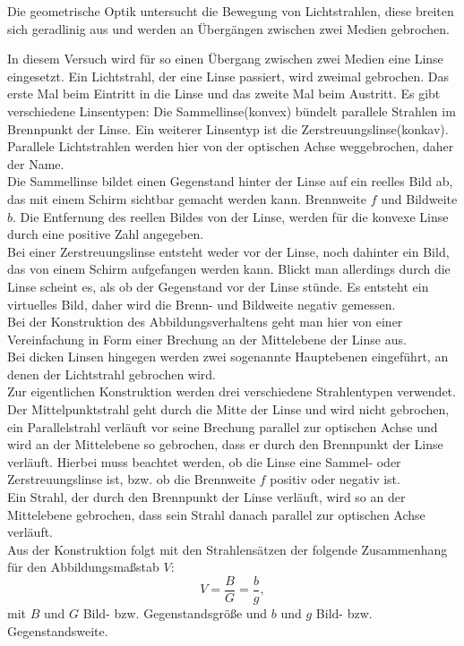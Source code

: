 Die geometrische Optik untersucht die Bewegung von Lichtstrahlen, diese breiten sich geradlinig aus und werden an Übergängen zwischen zwei Medien gebrochen.

In diesem Versuch wird für so einen Übergang zwischen zwei Medien eine Linse eingesetzt. Ein Lichtstrahl, der eine Linse
passiert, wird zweimal gebrochen. Das erste Mal beim Eintritt in
die Linse und das zweite Mal beim Austritt.  Es gibt verschiedene
Linsentypen:  Die Sammellinse(konvex) bündelt parallele Strahlen im Brennpunkt der Linse. Ein weiterer Linsentyp ist die
Zerstreuungslinse(konkav). Parallele Lichtstrahlen werden hier von der optischen Achse weggebrochen, daher der Name.\\

Die Sammellinse bildet einen Gegenstand hinter der Linse auf ein reelles Bild ab, das mit einem Schirm sichtbar gemacht werden kann. Brennweite $f$ und Bildweite $b$. Die Entfernung des reellen Bildes von der Linse, werden für die konvexe Linse durch eine positive Zahl angegeben.\\
Bei einer Zerstreuungslinse entsteht weder vor der Linse, noch dahinter ein
Bild, das von einem Schirm aufgefangen werden kann. Blickt man
allerdings durch die Linse scheint es, als ob der Gegenstand vor der
Linse stünde. Es entsteht ein virtuelles Bild, daher wird die Brenn- und Bildweite negativ gemessen.\\

Bei der Konstruktion des Abbildungsverhaltens geht man hier von einer Vereinfachung in Form einer Brechung an der Mittelebene der Linse aus.\\
Bei dicken Linsen hingegen werden zwei sogenannte
Hauptebenen eingeführt, an denen der Lichtstrahl gebrochen wird.\\
Zur eigentlichen Konstruktion werden drei verschiedene Strahlentypen
verwendet. Der Mittelpunktstrahl geht durch die Mitte der Linse und
wird nicht gebrochen, ein Parallelstrahl verläuft vor seine Brechung
parallel zur optischen Achse und wird an der Mittelebene so gebrochen,
dass er durch den Brennpunkt der Linse verläuft. Hierbei muss beachtet
werden, ob die Linse eine Sammel- oder Zerstreuungslinse ist, bzw. ob
die Brennweite $f$ positiv oder negativ ist.\\
Ein Strahl, der durch den Brennpunkt der Linse verläuft, wird so an der Mittelebene gebrochen, dass sein Strahl danach parallel zur optischen Achse verläuft.\\

Aus der Konstruktion folgt mit den Strahlensätzen der folgende
Zusammenhang für den Abbildungsmaßstab $V$:
%
\begin{equation}
  V = \frac{B}{G} = \frac{b}{g},
  \label{eq:Theorie_Abbildungsgesetz}
\end{equation}
%
mit $B$ und $G$ Bild- bzw. Gegenstandsgröße und $b$ und
$g$ Bild- bzw. Gegenstandsweite.\\

